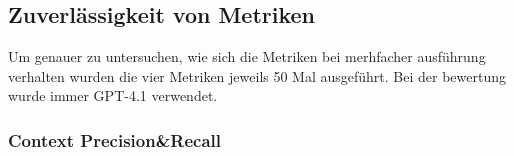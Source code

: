 \subsection{Zuverlässigkeit von Metriken}

Um genauer zu untersuchen, wie sich die Metriken bei merhfacher ausführung verhalten wurden die vier Metriken jeweils 50 Mal ausgeführt.
Bei der bewertung wurde immer GPT-4.1 verwendet.

\subsubsection{Context Precision\&Recall}


